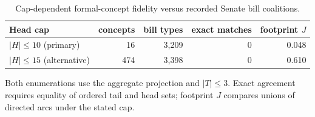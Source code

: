 \begin{table}[tbp]
\centering
\small
\caption{Cap-dependent formal-concept fidelity versus recorded Senate bill coalitions.}
\label{tab:senate-fidelity}
\begin{tabular}{lrrrr}
\toprule
Head cap & concepts & bill types & exact matches & footprint $J$ \\
\midrule
$|H|\leq10$ (primary) & 16 & 3,209 & 0 & 0.048 \\
$|H|\leq15$ (alternative) & 474 & 3,398 & 0 & 0.610 \\
\bottomrule
\end{tabular}
\par\vspace{2pt}\footnotesize Both enumerations use the aggregate projection and $|T|\leq3$. Exact agreement requires equality of ordered tail and head sets; footprint $J$ compares unions of directed arcs under the stated cap.
\end{table}
